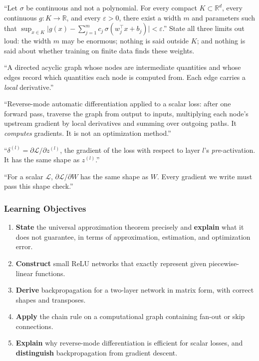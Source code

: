 \documentclass[11pt]{article}
\newcommand{\R}{\mathbb{R}}
\begin{document}
\begin{keydefs}[ -- Topic 1.2]
\begin{description}[leftmargin=0pt]
  \item[Universal approximation theorem (one hidden layer).] ``Let $\sigma$ be continuous and not a polynomial. For every compact $K \subset \R^d$, every continuous $g: K \to \R$, and every $\varepsilon > 0$, there exist a width $m$ and parameters such that $\sup_{x\in K}\big|g(x) - \sum_{j=1}^m c_j\,\sigma(w_j^\top x + b_j)\big| < \varepsilon$.'' State all three limits out loud: the width $m$ may be enormous; nothing is said outside $K$; and nothing is said about whether training on finite data finds these weights.
  \item[Computational graph.] ``A directed acyclic graph whose nodes are intermediate quantities and whose edges record which quantities each node is computed from. Each edge carries a \emph{local} derivative.''
  \item[Backpropagation.] ``Reverse-mode automatic differentiation applied to a scalar loss: after one forward pass, traverse the graph from output to inputs, multiplying each node's upstream gradient by local derivatives and summing over outgoing paths. It \emph{computes} gradients. It is not an optimization method.''
  \item[Error signal $\delta^{(l)}$.] ``$\delta^{(l)} = \partial\mathcal L / \partial z^{(l)}$, the gradient of the loss with respect to layer $l$'s \emph{pre}-activation. It has the same shape as $z^{(l)}$.''
  \item[Shape convention.] ``For a scalar $\mathcal L$, $\partial\mathcal L/\partial W$ has the same shape as $W$. Every gradient we write must pass this shape check.''
\end{description}
\end{keydefs}

\subsubsection*{Learning Objectives}
\begin{enumerate}[label=\textbf{LO 1.2.\arabic*}, leftmargin=*]
  \item \textbf{State} the universal approximation theorem precisely and \textbf{explain} what it does not guarantee, in terms of approximation, estimation, and optimization error.
  \item \textbf{Construct} small ReLU networks that exactly represent given piecewise-linear functions.
  \item \textbf{Derive} backpropagation for a two-layer network in matrix form, with correct shapes and transposes.
  \item \textbf{Apply} the chain rule on a computational graph containing fan-out or skip connections.
  \item \textbf{Explain} why reverse-mode differentiation is efficient for scalar losses, and \textbf{distinguish} backpropagation from gradient descent.
\end{enumerate}
\end{document}
